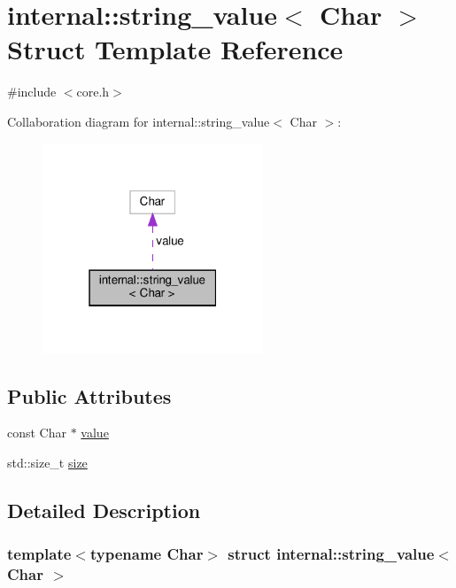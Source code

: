 \hypertarget{structinternal_1_1string__value}{}\section{internal\+:\+:string\+\_\+value$<$ Char $>$ Struct Template Reference}
\label{structinternal_1_1string__value}


{\ttfamily \#include $<$core.\+h$>$}



Collaboration diagram for internal\+:\+:string\+\_\+value$<$ Char $>$\+:
\nopagebreak
\begin{figure}[H]
\begin{center}
\leavevmode
\includegraphics[width=187pt]{structinternal_1_1string__value__coll__graph}
\end{center}
\end{figure}
\subsection*{Public Attributes}
\begin{DoxyCompactItemize}
\item 
const Char $\ast$ \hyperlink{structinternal_1_1string__value_a1ec13adb65d19bbdd8f5168e059e8e6d}{value}
\item 
std\+::size\+\_\+t \hyperlink{structinternal_1_1string__value_a6f416973ea8f719f71d8ff9dbbdcac77}{size}
\end{DoxyCompactItemize}


\subsection{Detailed Description}
\subsubsection*{template$<$typename Char$>$\newline
struct internal\+::string\+\_\+value$<$ Char $>$}




